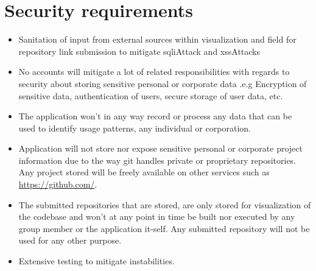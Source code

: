 \section{Security requirements}
\begin{itemize}
    \item Sanitation of input from external sources within visualization and field for repository link submission to mitigate \gls{sqliAttack} and \gls{xssAttack}s
    \item No accounts will mitigate a lot of related responsibilities with regards to security about storing sensitive personal or corporate data .e.g Encryption of sensitive data, authentication of users, secure storage of user data, etc.
    \item The application won't in any way record or process any data that can be used to identify usage patterns, any individual or corporation. 
    \item Application will not store nor expose sensitive personal or corporate project information due to the way \gls{git} handles private or \gls{proprietary} repositories. Any project stored will be freely available on other services such as \href{Github}{https://github.com/}.
    \item The submitted repositories that are stored, are only stored for visualization of the codebase and won't at any point in time be built nor executed by any group member or the application it-self. Any submitted repository will not be used for any other purpose.
    \item Extensive testing to mitigate instabilities.
\end{itemize}

